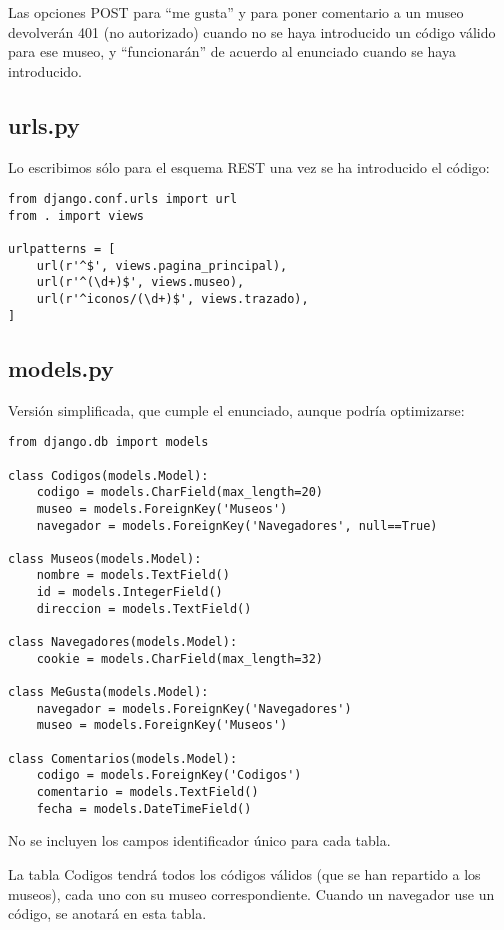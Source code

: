 Las opciones POST para ``me gusta'' y para poner comentario a un museo devolverán 401 (no autorizado) cuando no se haya introducido un código válido para ese museo, y ``funcionarán'' de acuerdo al enunciado cuando se haya introducido.


\subsection*{urls.py}

Lo escribimos sólo para el esquema REST una vez se ha introducido el código:

\begin{verbatim}
from django.conf.urls import url
from . import views

urlpatterns = [
    url(r'^$', views.pagina_principal),
    url(r'^(\d+)$', views.museo),
    url(r'^iconos/(\d+)$', views.trazado),
]
\end{verbatim}

\subsection*{models.py}

Versión simplificada, que cumple el enunciado, aunque podría optimizarse:

\begin{verbatim}
from django.db import models

class Codigos(models.Model):
    codigo = models.CharField(max_length=20)
    museo = models.ForeignKey('Museos')
    navegador = models.ForeignKey('Navegadores', null==True)

class Museos(models.Model):
    nombre = models.TextField()
    id = models.IntegerField()
    direccion = models.TextField()

class Navegadores(models.Model):
    cookie = models.CharField(max_length=32)

class MeGusta(models.Model):
    navegador = models.ForeignKey('Navegadores')
    museo = models.ForeignKey('Museos')

class Comentarios(models.Model):
    codigo = models.ForeignKey('Codigos')
    comentario = models.TextField()
    fecha = models.DateTimeField()
\end{verbatim}

No se incluyen los campos identificador único para cada tabla.

La tabla Codigos tendrá todos los códigos válidos (que se han repartido a los museos), cada uno con su museo correspondiente. Cuando un navegador use un código, se anotará en esta tabla.

